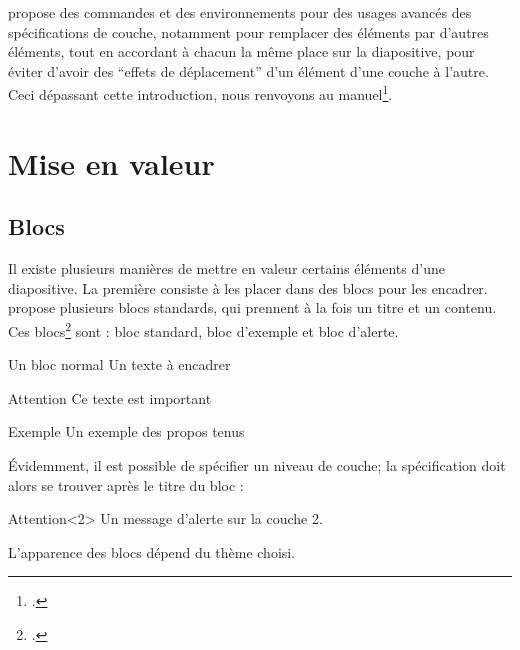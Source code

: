  propose des commandes et des environnements pour des usages avancés des spécifications de couche, notamment pour remplacer des éléments par d'autres éléments, tout en accordant à chacun la même place sur la diapositive, pour éviter d'avoir des \enquote{effets de déplacement} d'un élément d'une couche à l'autre. 
Ceci dépassant cette introduction, nous renvoyons au manuel\footcite{beamer_overlays}.
\section{Mise en valeur}

\subsection{Blocs}

Il existe plusieurs manières de mettre en valeur certains éléments d'une diapositive. La première  consiste à les placer dans des blocs pour les encadrer.  propose plusieurs blocs standards, qui prennent à la fois un titre et un contenu. Ces blocs\footcites[Il est possible de créer ses propres blocs : voir  ][]{beamer_box}[il existe aussi des éléments proches des blocs que sont les encadrés, pour mettre en valeur des définitions, des théorèmes : voir][]{beamer_theorems} sont  : bloc standard, bloc d'exemple et bloc d'alerte.

\begin{latexcode}
\begin{block}{Un bloc normal} 
    Un texte à encadrer
\end{block}
\begin{alertblock}{Attention} 
    Ce texte est important
\end{alertblock}
\begin{exampleblock}{Exemple} 
    Un exemple des propos tenus
\end{exampleblock}
\end{latexcode}

Évidemment, il est possible de spécifier un niveau de couche; la spécification doit alors se trouver après le titre du bloc :

\begin{latexcode}
\begin{alertblock}{Attention}<2>
    Un message d'alerte sur la couche 2.
\end{alertblock}
\end{latexcode}

L'apparence des blocs dépend du thème choisi.

